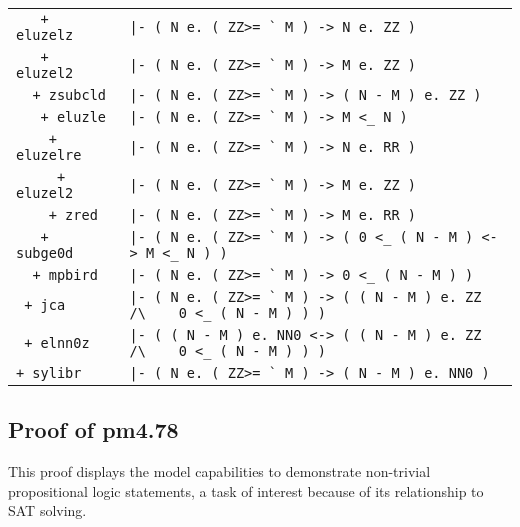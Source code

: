 \documentclass{article}
\begin{document}
\begin{tabular}{ |l|p{105mm}| }
\hline
\verb!   + eluzelz  ! & \verb!|- ( N e. ( ZZ>= ` M ) -> N e. ZZ )! \\
\verb!   + eluzel2  ! & \verb!|- ( N e. ( ZZ>= ` M ) -> M e. ZZ )! \\
\verb!  + zsubcld   ! & \verb!|- ( N e. ( ZZ>= ` M ) -> ( N - M ) e. ZZ )! \\
\verb!   + eluzle   ! & \verb!|- ( N e. ( ZZ>= ` M ) -> M <_ N )! \\
\verb!    + eluzelre! & \verb!|- ( N e. ( ZZ>= ` M ) -> N e. RR )! \\
\verb!     + eluzel2! & \verb!|- ( N e. ( ZZ>= ` M ) -> M e. ZZ )! \\
\verb!    + zred    ! & \verb!|- ( N e. ( ZZ>= ` M ) -> M e. RR )! \\
\verb!   + subge0d  ! & \verb!|- ( N e. ( ZZ>= ` M ) -> ( 0 <_ ( N - M ) <-> M <_ N ) )! \\
\verb!  + mpbird    ! & \verb!|- ( N e. ( ZZ>= ` M ) -> 0 <_ ( N - M ) )! \\
\verb! + jca        ! & \verb!|- ( N e. ( ZZ>= ` M ) -> ( ( N - M ) e. ZZ /\ !\newline\verb!   0 <_ ( N - M ) ) )! \\
\verb! + elnn0z     ! & \verb!|- ( ( N - M ) e. NN0 <-> ( ( N - M ) e. ZZ /\ !\newline\verb!   0 <_ ( N - M ) ) )! \\
\verb!+ sylibr      ! & \verb!|- ( N e. ( ZZ>= ` M ) -> ( N - M ) e. NN0 )! \\
\hline
\end{tabular}

\subsection{Proof of \textbf{pm4.78}}

This proof displays the model capabilities to demonstrate non-trivial propositional logic statements, a task of interest because of its relationship to SAT solving.
\end{document}
